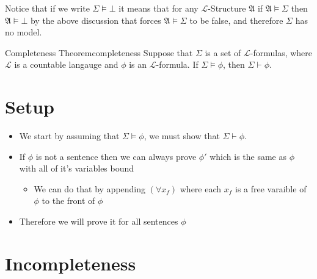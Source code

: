 Notice that if we write $ \Sigma \models \bot $ it means that for any $\mathcal{L}$-Structure $ \mathfrak{ A }   $ if $ \mathfrak{ A } \models \Sigma   $ then $ \mathfrak{ A } \models \bot  $ by the above discussion that forces $ \mathfrak{ A } \models \Sigma   $ to be false, and therefore $ \Sigma  $ has no model.

\begin{theorem}{Completeness Theorem}{completeness}
Suppose that $\Sigma$ is a set of $\mathcal{L}$-formulas, where $ \mathcal{L}$ is a countable langauge  and $\phi$ is an $\mathcal{L}$-formula. If $\Sigma \models \phi$, then $\Sigma \vdash \phi$.

\section*{Setup}

\begin{itemize}
    \item We start by assuming that $ \Sigma \models \phi$, we must show that $ \Sigma \vdash \phi$.
    \item If $ \phi$ is not a sentence then we can always prove $ \phi'$ which is the same as $ \phi$ with all of it's variables bound
    \begin{itemize}
        \item We can do that by appending $ \left( \forall  x _{f}  \right)$ where each $ x_{f}$  is a free varaible of $ \phi$ to the front of $ \phi$ 
    \end{itemize}
\item Therefore we will prove it for all sentences $ \phi$ %
\end{itemize}

\end{theorem}


\section{Incompleteness}








